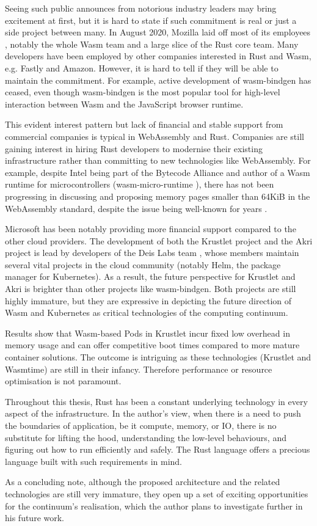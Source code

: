 Seeing such public announces from notorious industry leaders may bring excitement at first, but it is hard to state if such commitment is real or just a side project between many. In August 2020, Mozilla laid off most of its employees \cite{mozilla-lies-off}, notably the whole Wasm team and a large slice of the Rust core team. Many developers have been employed by other companies interested in Rust and Wasm, e.g. Fastly and Amazon. However, it is hard to tell if they will be able to maintain the commitment. For example, active development of wasm-bindgen \cite{wasm-bindgen} has ceased, even though wasm-bindgen is the most popular tool for high-level interaction between Wasm and the JavaScript browser runtime.

This evident interest pattern but lack of financial and stable support from commercial companies is typical in WebAssembly and Rust. Companies are still gaining interest in hiring Rust developers \cite{aws-rust} to modernise their existing infrastructure rather than committing to new technologies like WebAssembly. For example, despite Intel being part of the Bytecode Alliance and author of a Wasm runtime for microcontrollers (wasm-micro-runtime \cite{wasm-micro-runtime}), there has not been progressing in discussing and proposing memory pages smaller than 64KiB in the WebAssembly standard, despite the issue being well-known for years \cite{wasm-64}.

Microsoft has been notably providing more financial support compared to the other cloud providers. The development of both the Krustlet project and the Akri project is lead by developers of the Deis Labs team \cite{deislabs}, whose members maintain several vital projects in the cloud community (notably Helm, the package manager for Kubernetes). As a result, the future perspective for Krustlet and Akri is brighter than other projects like wasm-bindgen. Both projects are still highly immature, but they are expressive in depicting the future direction of Wasm and Kubernetes as critical technologies of the computing continuum.

Results show that Wasm-based Pods in Krustlet incur fixed low overhead in memory usage and can offer competitive boot times compared to more mature container solutions. The outcome is intriguing as these technologies (Krustlet and Wasmtime) are still in their infancy. Therefore performance or resource optimisation is not paramount.

Throughout this thesis, Rust has been a constant underlying technology in every aspect of the infrastructure. In the author's view, when there is a need to push the boundaries of application, be it compute, memory, or IO, there is no substitute for lifting the hood, understanding the low-level behaviours, and figuring out how to run efficiently and safely. The Rust language offers a precious language built with such requirements in mind.

As a concluding note, although the proposed architecture and the related technologies are still very immature, they open up a set of exciting opportunities for the continuum's realisation, which the author plans to investigate further in his future work.
